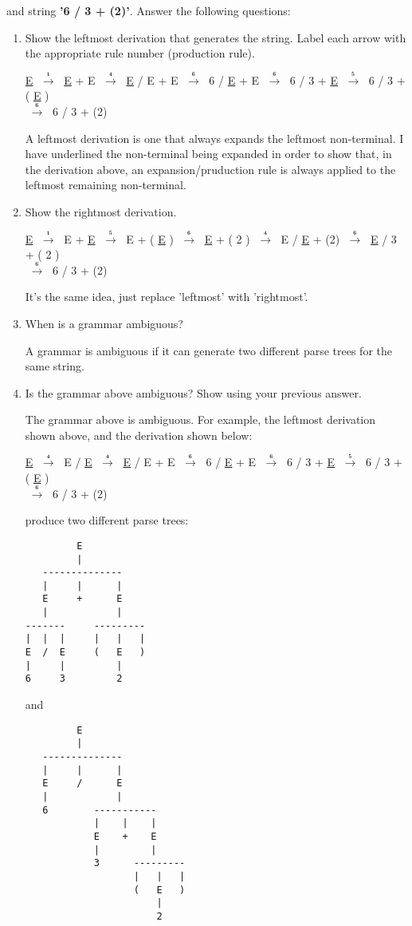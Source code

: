 \documentclass{article}
\newcommand{\regla}[1]{$\;\mathbf{\stackrel{{}_{#1}}{\longrightarrow}}\;$}
\begin{document}
and string \textbf{'6 / 3 + (2)'}. Answer the following questions:

\begin{enumerate}
\item Show the leftmost derivation that generates the string. Label each arrow with the appropriate rule number (production rule).

\underline{E} \regla{1} \underline{E} + E \regla{4} \underline{E} / E + E \regla{6} 6 / \underline{E} + E \regla{6} 6 / 3 + \underline{E} \regla{5} 6 / 3 + ( \underline{E} ) \\
\regla{6} 6 / 3 + (2)

A leftmost derivation is one that always expands the leftmost non-terminal. I have underlined the non-terminal being expanded in order to show that, in the derivation above, an expansion/pruduction rule is always applied to the leftmost remaining non-terminal.

\item Show the rightmost derivation.

\underline{E} \regla{1} E + \underline{E} \regla{5} E + ( \underline{E} ) \regla{6} \underline{E} + ( 2 ) \regla{4} E / \underline{E} + (2) \regla{6} \underline{E} / 3 + ( 2 ) \\
\regla{6} 6 / 3 + (2)

It's the same idea, just replace 'leftmost' with 'rightmost'.


\item When is a grammar ambiguous?

A grammar is ambiguous if it can generate two different parse trees for the same string.

\item Is the grammar above ambiguous? Show using your previous answer.


The grammar above is ambiguous. For example, the leftmost derivation shown above, and the derivation shown below:

\underline{E} \regla{4} E / \underline{E} \regla{4} \underline{E} / E + E \regla{6} 6 / \underline{E} + E \regla{6} 6 / 3 + \underline{E} \regla{5} 6 / 3 + ( \underline{E} ) \\
\regla{6} 6 / 3 + (2)

produce two different parse trees:

\begin{verbatim}
         E
         |  
   --------------
   |     |      |
   E     +      E
   |            |
-------     ---------
|  |  |     |   |   |
E  /  E     (   E   )
|     |         |
6     3         2
\end{verbatim}

and 

\begin{verbatim}
         E
         |  
   --------------
   |     |      |
   E     /      E
   |            |
   6        -----------
            |    |    |
            E    +    E
            |         |
            3      ---------
                   |   |   |
                   (   E   )
                       |
                       2
\end{verbatim}

\end{enumerate}
\end{document}
